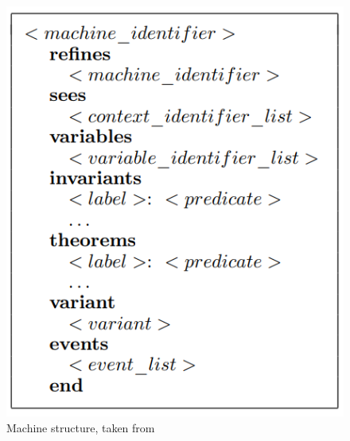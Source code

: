 \begin{figure}[H]
    \centering
    \includegraphics[scale = 0.5]{images/eventb3.PNG}
    \caption{Machine structure, taken from \cite{Abrial2011}}
    \label{fig:eventb3}
\end{figure}


